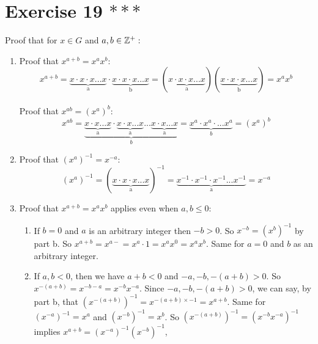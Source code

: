 \documentclass[12pt]{article}
\begin{document}
    \section*{Exercise 19 $***$}
    Proof that for $x \in G$ and $a, b \in \mathbb{Z}^{+}:$
    \begin{enumerate}[label=\textbf{\alph*.}]
        \item 
            Proof that $x^{a+b} = x^ax^b$: \\
            \[x^{a+b}
            = \underbrace{x \cdot x \cdot x ... x}_\text{a} \cdot
            \underbrace{x \cdot x \cdot x ... x}_\text{b}
            = (\underbrace{x \cdot x \cdot x ... x}_\text{a})(
                \underbrace{x \cdot x \cdot x ... x}_\text{b})
            = x^ax^b\] \\
            Proof that $x^{ab} = (x^a)^b$: \\
            \[x^{ab}
            = \underbrace{\underbrace{x \cdot x ... x}_\text{a} \cdot
            \underbrace{x \cdot x ... x}_\text{a} ...
            \underbrace{x \cdot x ... x}_\text{a}}_{b}
            = \underbrace{x^a \cdot x^a \cdot ... x^a}_{b}
            = (x^a)^b\]
        \item 
            Proof that $(x^a)^{-1} = x^{-a}$:
            \[(x^a)^{-1} = (\underbrace{x \cdot x \cdot x ... x}_\text{a})^{-1}
            = \underbrace{x^{-1} \cdot x^{-1} \cdot x^{-1} ... x^{-1}}_\text{a}
            = x^{-a}\]
        \item
            Proof that $x^{a+b} = x^ax^b$ applies even when $a, b \leqslant 0$:
            \begin{enumerate}[label=\textbf{case \arabic*:}]
                \item
                    If $b = 0$ and $a$ is an arbitrary integer
                    then $-b > 0$. So $x^{-b} = (x^{b})^{-1}$ by part b.
                    So $x^{a+b} = x^{a-} = x^a \cdot 1 = x^ax^0 = x^ax^b$.
                    Same for $a = 0$ and $b$ as an arbitrary integer.
                \item
                    If $a, b < 0$,
                    then we have $a + b < 0$
                    and $-a, -b, -(a+b) > 0$.
                    So $x^{-(a+b)} = x^{-b - a} = x^{-b}x^{-a}$.
                    Since $-a, -b, -(a+b) > 0$, we can say, by part b,
                    that $(x^{-(a+b)})^{-1} = x^{-(a+b) \times -1} = x^{a+b}$.
                    Same for $(x^{-a})^{-1} = x^a$ and $(x^{-b})^{-1} = x^b$.
                    So $(x^{-(a+b)})^{-1} = (x^{-b}x^{-a})^{-1}$
                    implies $x^{a+b} = (x^{-a})^{-1}(x^{-b})^{-1}$,

\end{enumerate}
\end{enumerate}
\end{document}
